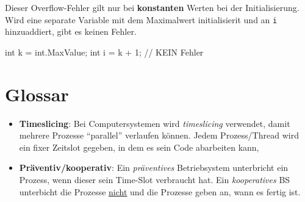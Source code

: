 \documentclass[
  10pt,
  a4paperpaper,
  DIV=11]{scrartcl}
\newenvironment{Shaded}{}{}
\newcommand{\CommentTok}[1]{\textcolor[rgb]{0.42,0.45,0.49}{#1}}
\newcommand{\DataTypeTok}[1]{\textcolor[rgb]{0.84,0.23,0.29}{#1}}
\newcommand{\DecValTok}[1]{\textcolor[rgb]{0.00,0.36,0.77}{#1}}
\newcommand{\FunctionTok}[1]{\textcolor[rgb]{0.44,0.26,0.76}{#1}}
\newcommand{\NormalTok}[1]{\textcolor[rgb]{0.14,0.16,0.18}{#1}}
\newcommand{\OperatorTok}[1]{\textcolor[rgb]{0.14,0.16,0.18}{#1}}
\numberwithin{equation}{section}
\begin{document}
\begin{tcolorbox}[enhanced jigsaw, coltitle=black, colbacktitle=quarto-callout-caution-color!10!white, opacityback=0, colframe=quarto-callout-caution-color-frame, arc=.35mm, breakable, toprule=.15mm, rightrule=.15mm, titlerule=0mm, bottomtitle=1mm, colback=white, toptitle=1mm, title=\textcolor{quarto-callout-caution-color}{\faFire}\hspace{0.5em}{Vorsicht}, bottomrule=.15mm, leftrule=.75mm, opacitybacktitle=0.6, left=2mm]

Dieser Overflow-Fehler gilt nur bei \textbf{konstanten} Werten bei der
Initialisierung. Wird eine separate Variable mit dem Maximalwert
initialisierit und an \texttt{i} hinzuaddiert, gibt es keinen Fehler.

\begin{Shaded}
\begin{Highlighting}[]
\DataTypeTok{int}\NormalTok{ k }\OperatorTok{=} \DataTypeTok{int}\OperatorTok{.}\FunctionTok{MaxValue}\OperatorTok{;}
\DataTypeTok{int}\NormalTok{ i }\OperatorTok{=}\NormalTok{ k }\OperatorTok{+} \DecValTok{1}\OperatorTok{;} \CommentTok{// KEIN Fehler}
\end{Highlighting}
\end{Shaded}

\end{tcolorbox}

\hypertarget{glossar}{%
\section{Glossar}\label{glossar}}

\begin{itemize}
\item
  \textbf{Timeslicing}: Bei Computersystemen wird \emph{timeslicing}
  verwendet, damit mehrere Prozesse ``parallel'' verlaufen können. Jedem
  Prozess/Thread wird ein fixer Zeitslot gegeben, in dem es sein Code
  abarbeiten kann,
\item
  \textbf{Präventiv/kooperativ}: Ein \emph{präventives} Betriebsystem
  unterbricht ein Prozess, wenn dieser sein Time-Slot verbraucht hat.
  Ein \emph{kooperatives} BS unterbicht die Prozesse \uline{nicht} und
  die Prozesse geben an, wann es fertig ist.
\end{itemize}
\end{document}
